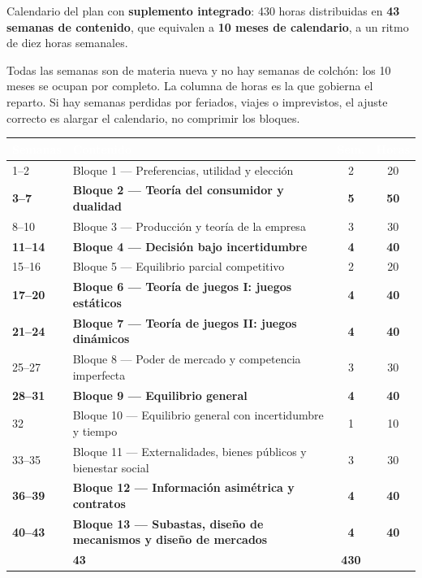 \documentclass[11pt,a4paper]{article}
\newcommand{\cab}[1]{\textcolor{white}{\sffamily\bfseries #1}}
\newcommand{\filasalternas}{\rowcolors{2}{white}{tonoPalido}}
\begin{document}
Calendario del plan con \textbf{suplemento integrado}: 430 horas distribuidas
en \textbf{43 semanas de contenido}, que equivalen a \textbf{10 meses de
calendario}, a un ritmo de diez horas semanales.

\medskip
\noindent Todas las semanas son de materia nueva y no hay semanas de colchón:
los 10 meses se ocupan por completo. La columna de horas es la que gobierna el
reparto. Si hay semanas perdidas por feriados, viajes o imprevistos, el ajuste
correcto es alargar el calendario, no comprimir los bloques.

\medskip
{\filasalternas
\noindent\begin{tabularx}{\textwidth}{lXcc}
\toprule
\rowcolor{tonoOscuro}\cab{Semanas} & \cab{Contenido} & \cab{Sem.} & \cab{Horas} \\
\midrule
1--2 & Bloque 1 --- Preferencias, utilidad y elección & 2 & 20 \\
\rowcolor{tonoHielo}\textbf{3--7} & \textbf{Bloque 2 --- Teoría del consumidor y dualidad} & \textbf{5} & \textbf{50} \\
8--10 & Bloque 3 --- Producción y teoría de la empresa & 3 & 30 \\
\rowcolor{tonoHielo}\textbf{11--14} & \textbf{Bloque 4 --- Decisión bajo incertidumbre} & \textbf{4} & \textbf{40} \\
15--16 & Bloque 5 --- Equilibrio parcial competitivo & 2 & 20 \\
\rowcolor{tonoHielo}\textbf{17--20} & \textbf{Bloque 6 --- Teoría de juegos I: juegos estáticos} & \textbf{4} & \textbf{40} \\
\rowcolor{tonoHielo}\textbf{21--24} & \textbf{Bloque 7 --- Teoría de juegos II: juegos dinámicos} & \textbf{4} & \textbf{40} \\
25--27 & Bloque 8 --- Poder de mercado y competencia imperfecta & 3 & 30 \\
\rowcolor{tonoHielo}\textbf{28--31} & \textbf{Bloque 9 --- Equilibrio general} & \textbf{4} & \textbf{40} \\
32 & Bloque 10 --- Equilibrio general con incertidumbre y tiempo & 1 & 10 \\
33--35 & Bloque 11 --- Externalidades, bienes públicos y bienestar social & 3 & 30 \\
\rowcolor{tonoHielo}\textbf{36--39} & \textbf{Bloque 12 --- Información asimétrica y contratos} & \textbf{4} & \textbf{40} \\
\rowcolor{tonoHielo}\textbf{40--43} & \textbf{Bloque 13 --- Subastas, diseño de mecanismos y diseño de mercados} & \textbf{4} & \textbf{40} \\
\midrule
\rowcolor{tonoHielo}\multicolumn{2}{l}{\textbf{Total}} & \textbf{43} & \textbf{430} \\
\bottomrule
\end{tabularx}
}
\end{document}
